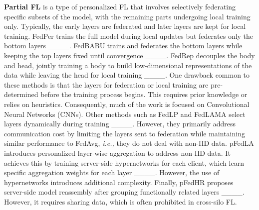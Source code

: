 \textbf{Partial FL} is a type of personalized FL that involves selectively federating specific subsets of the model, with the remaining parts undergoing local training only. Typically, the early layers are federated and later layers are kept for local training. FedPer trains the full model during local updates but federates only the bottom layers ____. FedBABU trains and federates the bottom layers while keeping the top layers fixed until convergence ____. FedRep decouples the body and head, jointly training a body to build low-dimensional representations of the data while leaving the head for local training ____. One drawback common to these methods is that the layers for federation or local training are pre-determined before the training process begins. This requires prior knowledge or relies on heuristics. Consequently, much of the work is focused on Convolutional Neural Networks (CNNs). Other methods such as FedLP and FedLAMA select layers dynamically during training ____. However, they primarily address communication cost by limiting the layers sent to federation while maintaining similar performance to FedAvg, \emph{i.e.,} they do not deal with non-IID data. pFedLA introduces personalized layer-wise aggregation to address non-IID data. It achieves this by training server-side hypernetworks for each client, which learn specific aggregation weights for each layer ____. However, the use of hypernetworks introduces additional complexity. Finally, pFedHR proposes server-side model reassembly after grouping functionally related layers ____. However, it requires sharing data, which is often prohibited in cross-silo FL.